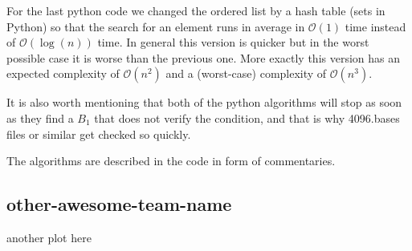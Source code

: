 \documentclass[11pt]{amsart}
\begin{document}
For the last python code we changed the ordered list by a hash table (sets in Python) so that the search for an element runs in average in $\mathcal{O}(1)$ time instead of $\mathcal{O}(\log(n))$ time.
In general this version is quicker but in the worst possible case it is worse than the previous one.
More exactly this version has an expected complexity of $\mathcal{O}(n^2)$ and a (worst-case) complexity of $\mathcal{O}(n^3)$.

It is also worth mentioning that both of the python algorithms will stop as soon as they find a $B_1$ that does not verify the condition, and that is why 4096.bases files or similar get checked so quickly.

The algorithms are described in the code in form of commentaries.


\subsection{other-awesome-team-name}

another plot here
\end{document}
